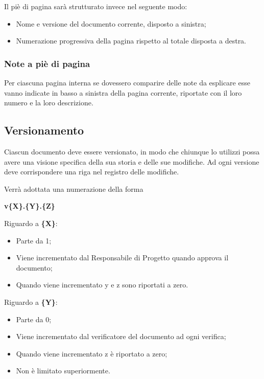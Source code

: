 	Il piè di pagina sarà strutturato invece nel seguente modo:
	
	\begin{itemize}
	
		\item Nome e versione del documento corrente, disposto a sinistra;
		\item Numerazione progressiva della pagina rispetto al totale disposta a destra.
	
	\end{itemize}
	
	\subsubsection{Note a piè di pagina}
	
	Per ciascuna pagina interna se dovessero comparire delle note da esplicare esse vanno indicate in basso a sinistra della pagina corrente, riportate con il loro numero e la loro descrizione.

\subsection{Versionamento}

Ciascun documento deve essere versionato, in modo che chiunque lo utilizzi possa avere una visione specifica della sua storia e delle sue modifiche. Ad ogni versione deve corrispondere una riga nel registro delle modifiche.

Verrà adottata una numerazione della forma
\begin{center}
 \textbf{v\{X\}.\{Y\}.\{Z\}}
\end{center}

Riguardo a \textbf{\{X\}}:
\begin{itemize}
 \item Parte da 1;
 \item Viene incrementato dal Responsabile di Progetto quando approva il documento;
 \item Quando viene incrementato y e z sono riportati a zero.
\end{itemize}

Riguardo a \textbf{\{Y\}}:
\begin{itemize}
 \item Parte da 0;
 \item Viene incrementato dal verificatore del documento ad ogni verifica;
 \item Quando viene incrementato z è riportato a zero;
 \item Non è limitato superiormente.
\end{itemize}

